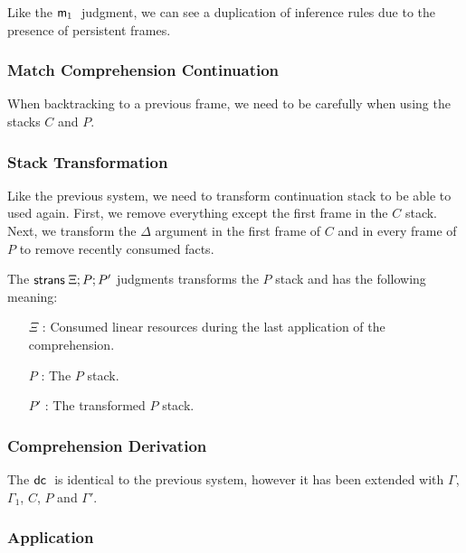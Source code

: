 Like the $\mathsf{m}_1 \;$ judgment, we can see a duplication of inference rules due to the presence of persistent frames.



\subsubsection{Match Comprehension Continuation}

When backtracking to a previous frame, we need to be carefully when using the stacks $C$ and $P$.



\subsubsection{Stack Transformation}

Like the previous system, we need to transform continuation stack to be able to used again. First, we remove everything except the first frame in the $C$ stack. Next, we transform the $\Delta$ argument in the first frame of $C$ and in every frame of $P$ to remove recently consumed facts.

The $\mathsf{strans} \; \Xi; P; P'$ judgments transforms the $P$ stack and has the following meaning:
\begin{enumerate}
   \item[$\Xi$]: Consumed linear resources during the last application of the comprehension.
   \item[$P$]: The $P$ stack.
   \item[$P'$]: The transformed $P$ stack.
\end{enumerate}





\subsubsection{Comprehension Derivation}

The $\mathsf{dc} \;$ is identical to the previous system, however it has been extended with $\Gamma$, $\Gamma_1$, $C$, $P$ and $\Gamma'$.



\subsubsection{Application}

